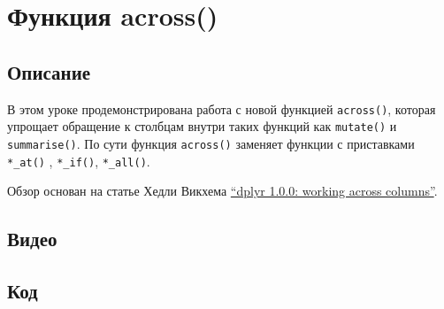 \documentclass[
]{book}
\begin{document}
\hypertarget{ux444ux443ux43dux43aux446ux438ux44f-across}{%
\chapter{Функция across()}\label{ux444ux443ux43dux43aux446ux438ux44f-across}}

\hypertarget{ux43eux43fux438ux441ux430ux43dux438ux435-1}{%
\section{Описание}\label{ux43eux43fux438ux441ux430ux43dux438ux435-1}}

В этом уроке продемонстрирована работа с новой функцией \texttt{across()}, которая упрощает обращение к столбцам внутри таких функций как \texttt{mutate()} и \texttt{summarise()}. По сути функция \texttt{across()} заменяет функции с приставками \texttt{*\_at()} , \texttt{*\_if()}, \texttt{*\_all()}.

Обзор основан на статье Хедли Викхема \href{https://www.tidyverse.org/blog/2020/04/dplyr-1-0-0-colwise/}{``dplyr 1.0.0: working across columns''}.

\hypertarget{ux432ux438ux434ux435ux43e-1}{%
\section{Видео}\label{ux432ux438ux434ux435ux43e-1}}

\hypertarget{ux43aux43eux434-1}{%
\section{Код}\label{ux43aux43eux434-1}}
\end{document}
